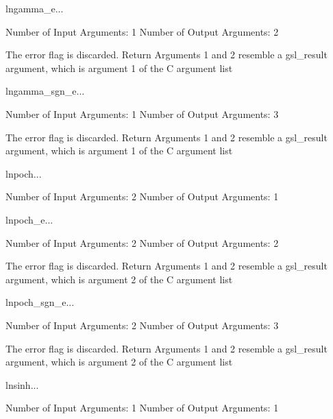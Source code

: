 \begin{funcdesc}{lngamma_e}{...}

    Number of Input  Arguments:  1
    Number of Output Arguments:  2

The error flag is discarded.
Return Arguments 1 and 2 resemble a gsl_result argument,
	which is  argument 1 of the C argument list

\end{funcdesc}

\begin{funcdesc}{lngamma_sgn_e}{...}

    Number of Input  Arguments:  1
    Number of Output Arguments:  3

The error flag is discarded.
Return Arguments 1 and 2 resemble a gsl_result argument,
	which is  argument 1 of the C argument list

\end{funcdesc}

\begin{funcdesc}{lnpoch}{...}

    Number of Input  Arguments:  2
    Number of Output Arguments:  1
\end{funcdesc}

\begin{funcdesc}{lnpoch_e}{...}

    Number of Input  Arguments:  2
    Number of Output Arguments:  2

The error flag is discarded.
Return Arguments 1 and 2 resemble a gsl_result argument,
	which is  argument 2 of the C argument list

\end{funcdesc}

\begin{funcdesc}{lnpoch_sgn_e}{...}

    Number of Input  Arguments:  2
    Number of Output Arguments:  3

The error flag is discarded.
Return Arguments 1 and 2 resemble a gsl_result argument,
	which is  argument 2 of the C argument list

\end{funcdesc}

\begin{funcdesc}{lnsinh}{...}

    Number of Input  Arguments:  1
    Number of Output Arguments:  1
\end{funcdesc}

